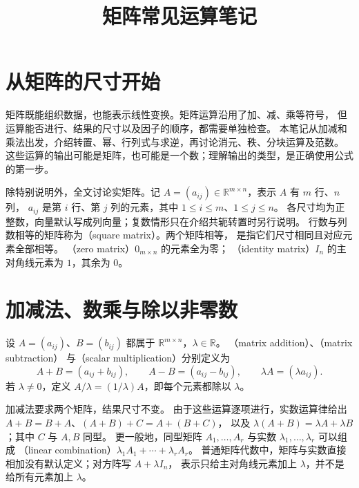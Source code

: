 \documentclass[UTF8,12pt,a4paper,fontset=fandol]{ctexart}
\title{矩阵常见运算笔记}
\author{}
\date{}
\begin{document}
\maketitle

\section{从矩阵的尺寸开始}

矩阵既能组织数据，也能表示线性变换。矩阵运算沿用了加、减、乘等符号，
但运算能否进行、结果的尺寸以及因子的顺序，都需要单独检查。
本笔记从加减和乘法出发，介绍转置、幂、行列式与求逆，再讨论消元、秩、分块运算及范数。
这些运算的输出可能是矩阵，也可能是一个数；理解输出的类型，是正确使用公式的第一步。

除特别说明外，全文讨论实矩阵。记 $A=(a_{ij})\in\mathbb R^{m\times n}$，表示 $A$ 有 $m$ 行、$n$ 列，
$a_{ij}$ 是第 $i$ 行、第 $j$ 列的元素，其中 $1\le i\le m$、$1\le j\le n$。
各尺寸均为正整数，向量默认写成列向量；复数情形只在介绍共轭转置时另行说明。
行数与列数相等的矩阵称为（square matrix）。两个矩阵相等，
是指它们尺寸相同且对应元素全部相等。
（zero matrix）$0_{m\times n}$ 的元素全为零；
（identity matrix）$I_n$ 的主对角线元素为 $1$，其余为 $0$。

\section{加减法、数乘与除以非零数}

\begin{definition}[逐项线性运算]
设 $A=(a_{ij})$、$B=(b_{ij})$ 都属于 $\mathbb R^{m\times n}$，$\lambda\in\mathbb R$。
（matrix addition）、（matrix subtraction）
与（scalar multiplication）分别定义为
\[
  A+B=(a_{ij}+b_{ij}),\qquad A-B=(a_{ij}-b_{ij}),\qquad
  \lambda A=(\lambda a_{ij}).
\]
若 $\lambda\ne0$，定义 $A/\lambda=(1/\lambda)A$，即每个元素都除以 $\lambda$。
\end{definition}

加减法要求两个矩阵，结果尺寸不变。
由于这些运算逐项进行，实数运算律给出 $A+B=B+A$、$(A+B)+C=A+(B+C)$，
以及 $\lambda(A+B)=\lambda A+\lambda B$；其中 $C$ 与 $A,B$ 同型。
更一般地，同型矩阵 $A_1,\ldots,A_r$ 与实数 $\lambda_1,\ldots,\lambda_r$ 可以组成
（linear combination）$\lambda_1A_1+\cdots+\lambda_rA_r$。
普通矩阵代数中，矩阵与实数直接相加没有默认定义；对方阵写 $A+\lambda I_n$，
表示只给主对角线元素加上 $\lambda$，并不是给所有元素加上 $\lambda$。
\end{document}
